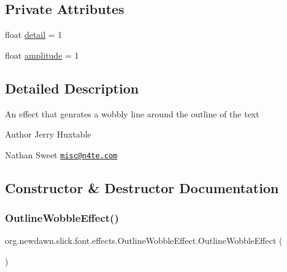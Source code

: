 \subsection*{Private Attributes}
\begin{DoxyCompactItemize}
\item 
float \mbox{\hyperlink{classorg_1_1newdawn_1_1slick_1_1font_1_1effects_1_1_outline_wobble_effect_ac43d2a2c878ac5034bf82a0837cfa86f}{detail}} = 1
\item 
float \mbox{\hyperlink{classorg_1_1newdawn_1_1slick_1_1font_1_1effects_1_1_outline_wobble_effect_a6797d66a3cfb14ca9b2e04bad9f2979e}{amplitude}} = 1
\end{DoxyCompactItemize}


\subsection{Detailed Description}
An effect that genrates a wobbly line around the outline of the text

\begin{DoxyAuthor}{Author}
Jerry Huxtable 

Nathan Sweet \href{mailto:misc@n4te.com}{\tt misc@n4te.\+com} 
\end{DoxyAuthor}


\subsection{Constructor \& Destructor Documentation}
\mbox{\label{classorg_1_1newdawn_1_1slick_1_1font_1_1effects_1_1_outline_wobble_effect_a641618cbb033e67840c61f27d09701cc}} 
\subsubsection{\texorpdfstring{Outline\+Wobble\+Effect()}{OutlineWobbleEffect()}\hspace{0.1cm}{\footnotesize\ttfamily [1/2]}}
{\footnotesize\ttfamily org.\+newdawn.\+slick.\+font.\+effects.\+Outline\+Wobble\+Effect.\+Outline\+Wobble\+Effect (\begin{DoxyParamCaption}{ }\end{DoxyParamCaption})\hspace{0.3cm}{\ttfamily [inline]}}

